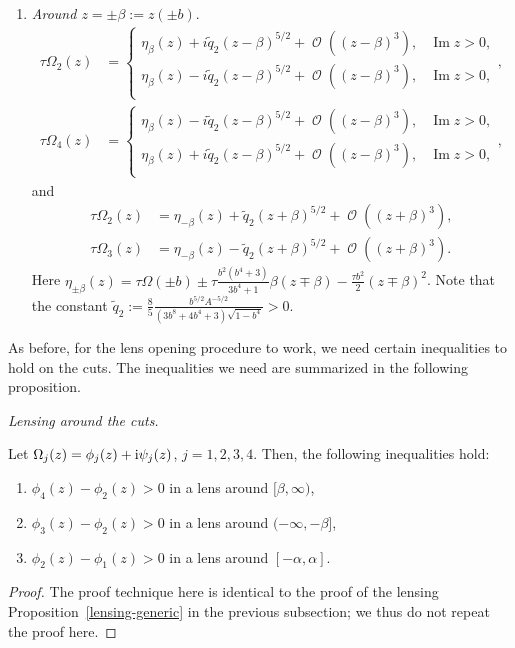 \documentclass[10pt,a4paper]{amsart}
\DeclareMathOperator{\OO}{\mathcal{O}}
\numberwithin{equation}{section}
\begin{document}
\begin{prop}
\begin{enumerate}
 \item \textit{Around $z = \pm\beta := z(\pm b).$}
 \begin{align}
 \tau\Omega_2(z) &=
 \begin{cases}
 \eta_{\beta}(z) + i\tilde{q}_2 (z-\beta)^{5/2} + \OO((z-\beta)^3), & \operatorname{Im}z>0,\\
 \eta_{\beta}(z) - i\tilde{q}_2 (z-\beta)^{5/2} + \OO((z-\beta)^3),& \operatorname{Im}z>0,\\
 \end{cases},\\
 \tau\Omega_4(z) &=
 \begin{cases}
 \eta_{\beta}(z) -i\tilde{q}_2 (z-\beta)^{5/2} + \OO((z-\beta)^3), & \operatorname{Im}z>0,\\
 \eta_{\beta}(z) + i\tilde{q}_2 (z-\beta)^{5/2} + \OO((z-\beta)^3),& \operatorname{Im}z>0,\\
 \end{cases},
 \end{align}
 and
 \begin{align}
 \tau\Omega_2(z) &= \eta_{-\beta}(z) + \tilde{q}_2 (z+\beta)^{5/2} + \OO((z+\beta)^3),\\
 \tau\Omega_3(z) &= \eta_{-\beta}(z) - \tilde{q}_2 (z+\beta)^{5/2} + \OO((z+\beta)^3).
 \end{align}
Here $\eta_{\pm \beta}(z) = \tau \Omega(\pm b) \pm \tau \frac{b^2(b^4+3)}{3b^4+1}\beta(z\mp\beta) -\frac{\tau b^2}{2}(z\mp\beta)^2$. Note that the constant $\tilde{q}_2 := \frac{8}{5}\frac{b^{5/2}A^{-5/2}}{(3b^8+4b^4+3)\sqrt{1-b^4}} >0$.
 \end{enumerate}
\end{prop}
As before, for the lens opening procedure to work, we need certain inequalities to hold on the cuts. The inequalities we need are summarized in the following proposition.
 \begin{prop}
 \textit{Lensing around the cuts.}

 Let $\Omega_j(z) = \phi_j(z) + {\rm i}\psi_j(z)$, $j= 1,2,3,4$. Then, the following inequalities hold:
 \begin{enumerate}\itemsep=0pt
 \item $\phi_4(z) - \phi_2(z) > 0$ in a lens around $[\beta,\infty)$,
 \item $\phi_3(z) - \phi_2(z) > 0$ in a lens around $(-\infty,-\beta]$,
 \item $\phi_2(z) - \phi_1(z) > 0$ in a lens around $[-\alpha,\alpha]$.
 \end{enumerate}
 \end{prop}
\begin{proof}
 The proof technique here is identical to the proof of the lensing Proposition~\ref{lensing-generic} in the previous subsection; we thus do not repeat the proof here.
\end{proof}
\end{document}
